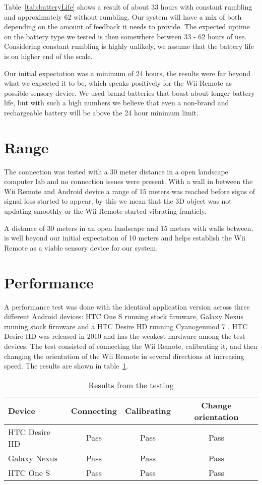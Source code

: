 Table~\ref{tab:batteryLife} shows a result of about 33 hours with constant rumbling and approximately 62 without rumbling. Our system will have a mix of both depending on the amount of feedback it needs to provide. The expected uptime on the battery type we tested is then somewhere between 33 - 62 hours of use. Considering constant rumbling is highly unlikely, we assume that the battery life is on higher end of the scale.

Our initial expectation was a minimum of 24 hours, the results were far beyond what we expected it to be, which speaks positively for the Wii Remote as possible sensory device. We used brand batteries that boast about longer battery life, but with such a high numbers we believe that even a non-brand and rechargeable battery will be above the 24 hour minimum limit.

\section{Range}
The connection was tested with a 30 meter distance in a open landscape computer lab and no connection issues were present. With a wall in between the Wii Remote and Android device a range of 15 meters was reached before signs of signal loss started to appear, by this we mean that the 3D object was not updating smoothly or the Wii Remote started vibrating franticly.

A distance of 30 meters in an open landscape and 15 meters with walls between, is well beyond our initial expectation of 10 meters and helps establish the Wii Remote as a viable sensory device for our system.

\section{Performance}
A performance test was done with the identical application version across three different Android devices: HTC One S running stock firmware, Galaxy Nexus running stock firmware and a HTC Desire HD running Cyanogenmod 7 \cite{cyanogenmod}. HTC Desire HD was released in 2010 and has the weakest hardware among the test devices. The test consisted of connecting the Wii Remote, calibrating it, and then changing the orientation of the Wii Remote in several directions at increasing speed. The results are shown in table~\ref{tab:testResults}.

\begin{table}[h!]
\centering
\begin{tabularx}{\textwidth}{|X||c|c|c|}
\hline
\textbf{Device} & \textbf{Connecting} & \textbf{Calibrating} & \textbf{Change orientation} \\ \hline
HTC Desire HD & Pass & Pass & Pass \\ \hline
Galaxy Nexus & Pass & Pass & Pass \\ \hline
HTC One S & Pass & Pass & Pass \\ \hline

\end{tabularx}
\caption{\footnotesize Results from the testing}
\label{tab:testResults}
\end{table}

